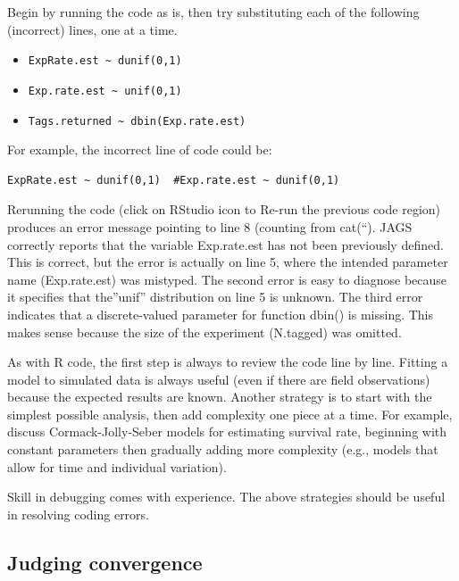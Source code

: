\documentclass[
]{krantz}
\providecommand{\tightlist}{%
  \setlength{\itemsep}{0pt}\setlength{\parskip}{0pt}}
\begin{document}
Begin by running the code as is, then try substituting each of the following (incorrect) lines, one at a time.

\begin{itemize}
\tightlist
\item
  \texttt{ExpRate.est\ \textasciitilde{}\ dunif(0,1)}
\item
  \texttt{Exp.rate.est\ \textasciitilde{}\ unif(0,1)}
\item
  \texttt{Tags.returned\ \textasciitilde{}\ dbin(Exp.rate.est)}
\end{itemize}

For example, the incorrect line of code could be:

\begin{verbatim}
ExpRate.est ~ dunif(0,1)  #Exp.rate.est ~ dunif(0,1)
\end{verbatim}

Rerunning the code (click on RStudio icon to Re-run the previous code region) produces an error message pointing to line 8 (counting from cat(``). JAGS correctly reports that the variable Exp.rate.est has not been previously defined. This is correct, but the error is actually on line 5, where the intended parameter name (Exp.rate.est) was mistyped. The second error is easy to diagnose because it specifies that the''unif'' distribution on line 5 is unknown. The third error indicates that a discrete-valued parameter for function dbin() is missing. This makes sense because the size of the experiment (N.tagged) was omitted.

As with R code, the first step is always to review the code line by line. Fitting a model to simulated data is always useful (even if there are field observations) because the expected results are known. Another strategy is to start with the simplest possible analysis, then add complexity one piece at a time. For example, \citet{kéry.schaub_2012} discuss Cormack-Jolly-Seber \citep{royle_2008} models for estimating survival rate, beginning with constant parameters then gradually adding more complexity (e.g., models that allow for time and individual variation).

Skill in debugging comes with experience. The above strategies should be useful in resolving coding errors.

\hypertarget{Convergence}{%
\subsection{Judging convergence}\label{Convergence}}
\end{document}
